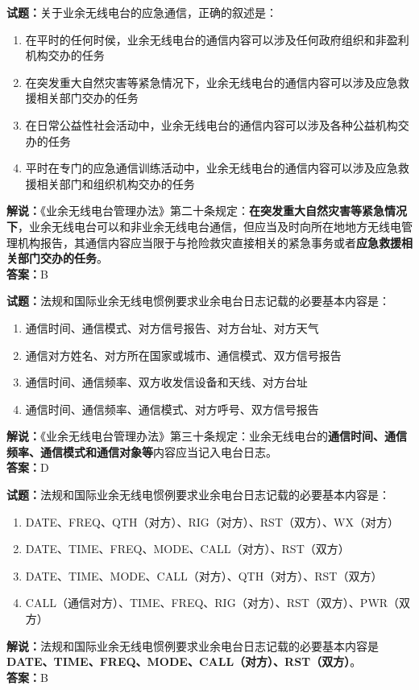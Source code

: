 \documentclass{ctexbook}
\begin{document}
\bigskip


\noindent\textbf{试题：}关于业余无线电台的应急通信，正确的叙述是：
\begin{enumerate}[leftmargin=3em]
	\item 在平时的任何时侯，业余无线电台的通信内容可以涉及任何政府组织和非盈利机构交办的任务
	\item 在突发重大自然灾害等紧急情况下，业余无线电台的通信内容可以涉及应急救援相关部门交办的任务
	\item 在日常公益性社会活动中，业余无线电台的通信内容可以涉及各种公益机构交办的任务
	\item 平时在专门的应急通信训练活动中，业余无线电台的通信内容可以涉及应急救援相关部门和组织机构交办的任务
\end{enumerate}
\noindent\textbf{解说：}《业余无线电台管理办法》第二十条规定：\textbf{在突发重大自然灾害等紧急情况下}，业余无线电台可以和非业余无线电台通信，但应当及时向所在地地方无线电管理机构报告，其通信内容应当限于与抢险救灾直接相关的紧急事务或者\textbf{应急救援相关部门交办的任务}。\\\noindent\textbf{答案：}B




\bigskip


\noindent\textbf{试题：}法规和国际业余无线电惯例要求业余电台日志记载的必要基本内容是：
\begin{enumerate}[leftmargin=3em]
	\item 通信时间、通信模式、对方信号报告、对方台址、对方天气
	\item 通信对方姓名、对方所在国家或城市、通信模式、双方信号报告
	\item 通信时间、通信频率、双方收发信设备和天线、对方台址
	\item 通信时间、通信频率、通信模式、对方呼号、双方信号报告
\end{enumerate}
\noindent\textbf{解说：}《业余无线电台管理办法》第三十条规定：业余无线电台的\textbf{通信时间、通信频率、通信模式和通信对象等}内容应当记入电台日志。\\\noindent\textbf{答案：}D



\bigskip


\noindent\textbf{试题：}法规和国际业余无线电惯例要求业余电台日志记载的必要基本内容是：
\begin{enumerate}[leftmargin=3em]
	\item DATE、FREQ、QTH（对方）、RIG（对方）、RST（双方）、WX（对方）
	\item DATE、TIME、FREQ、MODE、CALL（对方）、RST（双方）
	\item DATE、TIME、MODE、CALL（对方）、QTH（对方）、RST（双方）
	\item CALL（通信对方）、TIME、FREQ、RIG（对方）、RST（双方）、PWR（双方）
\end{enumerate}
\noindent\textbf{解说：}法规和国际业余无线电惯例要求业余电台日志记载的必要基本内容是\textbf{DATE、TIME、FREQ、MODE、CALL（对方）、RST（双方）}。\\\noindent\textbf{答案：}B
\end{document}
